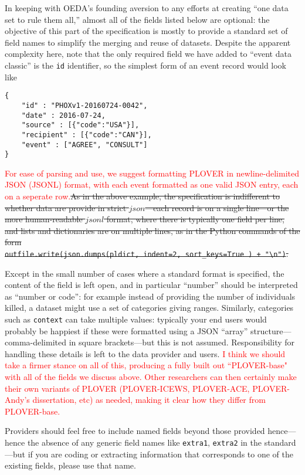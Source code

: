 \documentclass[11pt]{report}
\newcommand{\andy}[1]{\textcolor{red}{#1}}
\begin{document}
In keeping with OEDA's founding aversion to any efforts at creating ``one data set to rule them all,'' almost all of the fields listed below are optional: the objective of this part of the specification is mostly to provide a standard set of field names to simplify the merging and reuse of datasets. Despite the apparent complexity here, note that the only required field we have added to ``event data classic'' is the \texttt{id} identifier, so the simplest form of an event record would look like
\begin{verbatim}
{
	"id" : "PHOXv1-20160724-0042",
	"date" : 2016-07-24,
	"source" : [{"code":"USA"}],
	"recipient" : [{"code":"CAN"}],
	"event" : ["AGREE", "CONSULT"]
}
\end{verbatim}

\noindent \andy{For ease of parsing and use, we suggest formatting PLOVER in newline-delimited JSON (JSONL) format, with each event formatted as one valid JSON entry, each on a seperate row.}\sout{As in the above example, the specification is indifferent to whether data are provide in strict $json$---each record is on a single line---or the more human-readable $jsonl$ format, where there is typically one field per line, and lists and dictionaries are on multiple lines, as in the Python commands of the form\\ \indent \texttt{outfile.write(json.dumps(pldict, indent=2, sort\_keys=True ) + "\textbackslash n")}.}

Except in the small number of cases where a standard format is specified, the content of the field is left open, and in particular ``number'' should be interpreted as ``number or code'': for example instead of providing the number of individuals killed, a dataset might use a set of categories giving ranges. Similarly, categories such as \texttt{context} can take multiple values: typically your end users would probably be happiest if these were formatted using a JSON ``array'' structure---comma-delimited in square brackets---but this is not assumed. Responsibility for handling these details is left to the data provider and users. \andy{I think we should take a firmer stance on all of this, producing a fully built out ``PLOVER-base" with all of the fields we discuss above. Other researchers can then certainly make their own variants of PLOVER (PLOVER-ICEWS, PLOVER-ACE, PLOVER-Andy's dissertation, etc) as needed, making it clear how they differ from PLOVER-base.}

Providers should feel free to include named fields beyond those provided hence---hence the absence of any generic field names like \texttt{extra1}, \texttt{extra2} in the standard---but if you are coding or extracting information that corresponds to one of the existing fields, please use that name.
\end{document}
